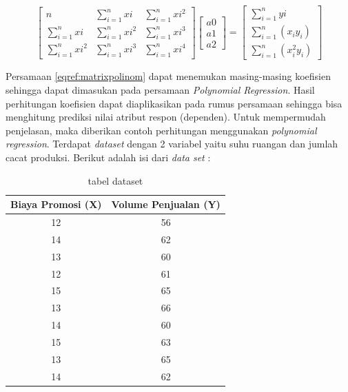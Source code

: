 \documentclass[a4paper,twoside]{article}
\begin{document}
\begin{enumerate}
		\begin{equation}
			\begin{bmatrix}
			n & \sum_{i=1}^{n}xi & \sum_{i=1}^{n}xi ^2 \\
			\sum_{i=1}^{n}xi & \sum_{i=1}^{n}xi^2 & \sum_{i=1}^{n} xi^3 \\
			\sum_{i=1}^{n} xi^2 & \sum_{i=1}^{n} xi^3 & \sum_{i=1}^{n}xi^4
			\end{bmatrix}
			\begin{bmatrix}
			a0 \\ 
			a1 \\ 
			a2
			\end{bmatrix}
			=
			\begin{bmatrix}
				 \sum_{i = 1}^{n} yi \\
				 \sum_{i=1}^{n} (x_i y_i) \\
				 \sum_{i=1}^{n}(x_i^2 y_i)
			\end{bmatrix}
			\label{eqref:matrixpolinom}
		\end{equation}
		
Persamaan \eqref{eqref:matrixpolinom} dapat menemukan masing-masing koefisien sehingga dapat dimasukan pada persamaan \textit{Polynomial Regression}. Hasil perhitungan koefisien dapat diaplikasikan pada rumus persamaan sehingga bisa menghitung prediksi nilai atribut respon (dependen).
\pagebreak
Untuk mempermudah penjelasan, maka diberikan contoh perhitungan menggunakan \textit{polynomial regression}. Terdapat \textit{dataset} dengan 2 variabel yaitu suhu ruangan dan jumlah cacat produksi. Berikut adalah isi dari \textit{data set} : 

\begin{table}[ht]
\centering
\begin{tabular}{|c|c|}
\hline 
Biaya Promosi (X) & Volume Penjualan (Y) \\ 
\hline 
12 & 56 \\ 
\hline 
14 & 62 \\ 
\hline 
13 & 60 \\ 
\hline 
12 & 61 \\ 
\hline 
15 & 65 \\ 
\hline 
13 & 66 \\ 
\hline 
14 & 60 \\ 
\hline 
15 & 63 \\ 
\hline 
13 & 65 \\ 
\hline 
14 & 62 \\ 
\hline 
\end{tabular} 
\caption{tabel dataset }
\label{tab:datasetpolynom}
\end{table}


\end{enumerate}
\end{document}
